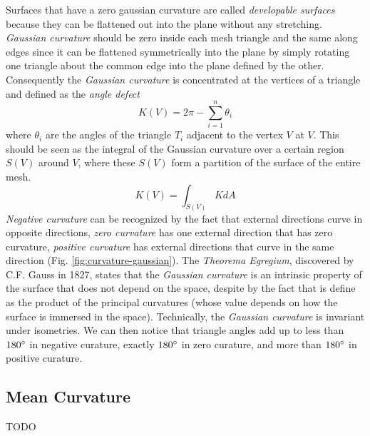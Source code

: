 Surfaces that have a zero gaussian curvature are called \textit{developable surfaces} because they can be flattened out into the plane without any stretching. \textit{Gaussian curvature} should be zero inside each mesh triangle and the same along edges since it can be flattened symmetrically into the plane by simply rotating one triangle about the common edge into the plane defined by the other. Consequently the \textit{Gaussian curvature} is concentrated at the vertices of a triangle and defined as the \textit{angle defect}
$$K(V) = 2 \pi - \sum_{i=1}^n \theta_i$$
where $\theta_i$ are the angles of the triangle $T_i$ adjacent to the vertex $V$ at $V$. This should be seen as the integral of the Gaussian curvature over a certain region $S(V)$ around $V$, where these $S(V)$ form a partition of the surface of the entire mesh.
$$ K(V) = \int_{S(V)} KdA  $$
\textit{Negative curvature} can be recognized by the fact that external directions curve in opposite directions, \textit{zero curvature} has one external direction that has zero curvature, \textit{positive curvature} has external directions that curve in the same direction (Fig. \ref{fig:curvature-gaussian}).
The \textit{Theorema Egregium}, discovered by C.F. Gauss in 1827, states that the \textit{Gaussian curvature} is an intrinsic property of the surface that does not depend on the space, despite by the fact that is define as the product of the principal curvatures (whose value depends on how the surface is immersed in the space). Technically, the \textit{Gaussian curvature} is invariant under isometries.
We can then notice that triangle angles add up to less than $180 \degree$ in negative curature, exactly $180 \degree$ in zero curature, and more than $180 \degree$ in positive curature.




\subsection{Mean Curvature}
TODO


